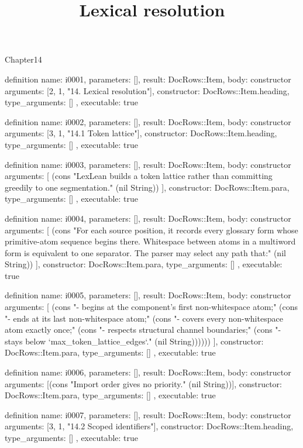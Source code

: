\begin{lexlean}{Chapter14}
\title{Lexical resolution}
\begin{semanticmodule}
definition{
  name: i0001,
  parameters: [],
  result: DocRows::Item,
  body: constructor{
    arguments: [2, 1, "14. Lexical resolution"],
    constructor: DocRows::Item.heading,
    type_arguments: []
  },
  executable: true
}

definition{
  name: i0002,
  parameters: [],
  result: DocRows::Item,
  body: constructor{
    arguments: [3, 1, "14.1 Token lattice"],
    constructor: DocRows::Item.heading,
    type_arguments: []
  },
  executable: true
}

definition{
  name: i0003,
  parameters: [],
  result: DocRows::Item,
  body: constructor{
    arguments: [
      (cons "LexLean builds a token lattice rather than committing greedily to one segmentation." (nil String))
    ],
    constructor: DocRows::Item.para,
    type_arguments: []
  },
  executable: true
}

definition{
  name: i0004,
  parameters: [],
  result: DocRows::Item,
  body: constructor{
    arguments: [
      (cons "For each source position, it records every glossary form whose primitive-atom sequence begins there. Whitespace between atoms in a multiword form is equivalent to one separator. The parser may select any path that:" (nil String))
    ],
    constructor: DocRows::Item.para,
    type_arguments: []
  },
  executable: true
}

definition{
  name: i0005,
  parameters: [],
  result: DocRows::Item,
  body: constructor{
    arguments: [
      (cons "- begins at the component's first non-whitespace atom;" (cons "- ends at its last non-whitespace atom;" (cons "- covers every non-whitespace atom exactly once;" (cons "- respects structural channel boundaries;" (cons "- stays below `max_token_lattice_edges`." (nil String))))))
    ],
    constructor: DocRows::Item.para,
    type_arguments: []
  },
  executable: true
}

definition{
  name: i0006,
  parameters: [],
  result: DocRows::Item,
  body: constructor{
    arguments: [(cons "Import order gives no priority." (nil String))],
    constructor: DocRows::Item.para,
    type_arguments: []
  },
  executable: true
}

definition{
  name: i0007,
  parameters: [],
  result: DocRows::Item,
  body: constructor{
    arguments: [3, 1, "14.2 Scoped identifiers"],
    constructor: DocRows::Item.heading,
    type_arguments: []
  },
  executable: true
}


\end{semanticmodule}
\end{lexlean}
